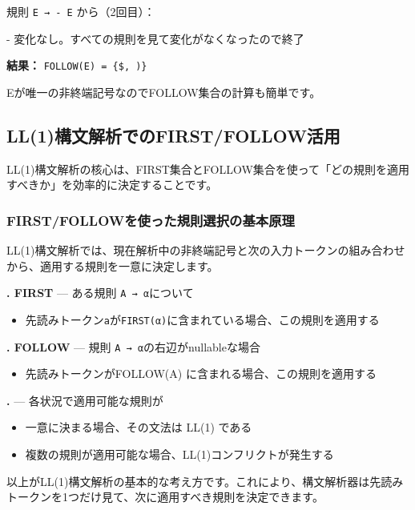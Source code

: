 規則 \texttt{E\ →\ -\ E} から（2回目）：

\begin{codescreen}{}
- 変化なし。すべての規則を見て変化がなくなったので終了
\end{codescreen}

\textbf{結果：}
\texttt{FOLLOW(E)\ =\ \{\$,\ \textquotesingle{})\textquotesingle{}\}}

Eが唯一の非終端記号なのでFOLLOW集合の計算も簡単です。

\subsection{LL(1)構文解析でのFIRST/FOLLOW活用}

LL(1)構文解析の核心は、FIRST集合とFOLLOW集合を使って「どの規則を適用すべきか」を効率的に決定することです。

\subsubsection{FIRST/FOLLOWを使った規則選択の基本原理}

LL(1)構文解析では、現在解析中の非終端記号と次の入力トークンの組み合わせから、適用する規則を一意に決定します。

\textbf{. FIRST} --- ある規則 \texttt{A\ →\ α}について

\begin{itemize}
\item 先読みトークン\texttt{a}が\texttt{FIRST(α)}に含まれている場合、この規則を適用する
\end{itemize}

\textbf{. FOLLOW} --- 規則 \texttt{A\ →\ α}の右辺がnullableな場合

\begin{itemize}
\item 先読みトークンがFOLLOW(A) に含まれる場合、この規則を適用する
\end{itemize}

\textbf{. } --- 各状況で適用可能な規則が

\begin{itemize}
\item 一意に決まる場合、その文法は LL(1) である
\item 複数の規則が適用可能な場合、LL(1)コンフリクトが発生する
\end{itemize}

以上がLL(1)構文解析の基本的な考え方です。これにより、構文解析器は先読みトークンを1つだけ見て、次に適用すべき規則を決定できます。

